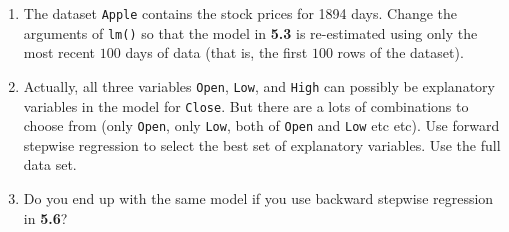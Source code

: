 \documentclass[a4paper]{article}
\begin{document}
\begin{enumerate}
 \item The dataset \texttt{Apple} contains the stock prices for 1894 days. Change the
   arguments of \texttt{lm()} so that the model in \textbf{5.3} is re-estimated using only the most
   recent $100$ days of data (that is, the first $100$ rows of the dataset). 

 \item Actually, all three variables \texttt{Open}, \texttt{Low}, and
   \texttt{High} can possibly be explanatory variables in the model for \texttt{Close}. But there are a
   lots of combinations to choose from (only \texttt{Open}, only \texttt{Low}, both of
   \texttt{Open} and \texttt{Low} etc etc). Use forward stepwise regression to select the
   best set of explanatory variables. Use the full data set.

 \item Do you end up with the same model if you use backward stepwise regression in
   \textbf{5.6}?

\end{enumerate}
\end{document}
